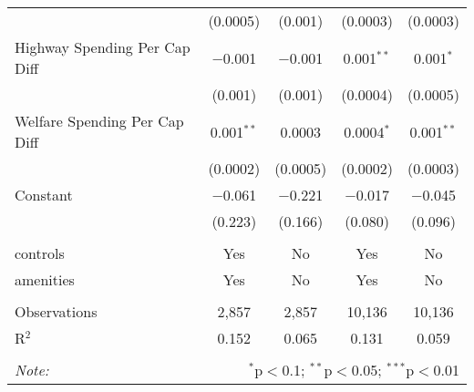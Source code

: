 \begin{table}[!htbp]
\begin{tabular}{@{\extracolsep{5pt}}lcccc}
  & (0.0005) & (0.001) & (0.0003) & (0.0003) \\ 
  Highway Spending Per Cap Diff & $-$0.001 & $-$0.001 & 0.001$^{**}$ & 0.001$^{*}$ \\ 
  & (0.001) & (0.001) & (0.0004) & (0.0005) \\ 
  Welfare Spending Per Cap Diff & 0.001$^{**}$ & 0.0003 & 0.0004$^{*}$ & 0.001$^{**}$ \\ 
  & (0.0002) & (0.0005) & (0.0002) & (0.0003) \\ 
  Constant & $-$0.061 & $-$0.221 & $-$0.017 & $-$0.045 \\ 
  & (0.223) & (0.166) & (0.080) & (0.096) \\ 
 \hline \\[-1.8ex] 
controls & Yes & No & Yes & No \\ 
amenities & Yes & No & Yes & No \\ 
\hline \\[-1.8ex] 
Observations & 2,857 & 2,857 & 10,136 & 10,136 \\ 
R$^{2}$ & 0.152 & 0.065 & 0.131 & 0.059 \\ 
\hline 
\hline \\[-1.8ex] 
\textit{Note:}  & \multicolumn{4}{r}{$^{*}$p$<$0.1; $^{**}$p$<$0.05; $^{***}$p$<$0.01} \\ 
\end{tabular} 
\end{table} 
